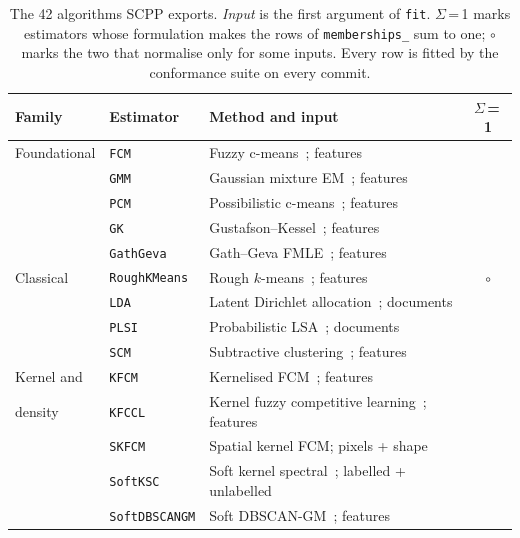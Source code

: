 \documentclass[twoside,11pt]{article}
\newcommand{\cmark}{\textcolor{green!70!black}{\ding{51}}}
\newcommand{\xmark}{\textcolor{red!75!black}{\ding{55}}}
\newcommand{\pmark}{\textcolor{orange!80!black}{$\circ$}}
\begin{document}
\begin{table}[ht]
\centering
\caption{The 42 algorithms SCPP exports. \emph{Input} is the first argument
of \texttt{fit}. $\Sigma$\,=\,1 marks estimators whose formulation makes the
rows of \texttt{memberships\_} sum to one; \pmark{} marks the two that
normalise only for some inputs. Every row is fitted by the conformance suite
on every commit.}
\small
\setlength{\tabcolsep}{4pt}
\renewcommand{\arraystretch}{1.1}
\label{tab:scpp_algorithm_families}

\begin{tabular}{p{2.6cm} p{3.4cm} p{4.4cm} c}
\toprule
\textbf{Family} & \textbf{Estimator} & \textbf{Method and input} & $\Sigma$\,=\,1 \\
\midrule

\rowcolor{gray!10}
Foundational & \texttt{FCM} & Fuzzy c-means~\cite{bezdek1981pattern}; features & \cmark \\
\rowcolor{gray!10}
& \texttt{GMM} & Gaussian mixture EM~\cite{dempster1977maximum}; features & \cmark \\
\rowcolor{gray!10}
& \texttt{PCM} & Possibilistic c-means~\cite{krishnapuram1993possibilistic}; features & \xmark \\
\rowcolor{gray!10}
& \texttt{GK} & Gustafson--Kessel~\cite{gustafson1979fuzzy}; features & \cmark \\
\rowcolor{gray!10}
& \texttt{GathGeva} & Gath--Geva FMLE~\cite{gath1989fuzzy}; features & \cmark \\

Classical
& \texttt{RoughKMeans} & Rough $k$-means~\cite{lingras2004interval}; features & \pmark \\
& \texttt{LDA} & Latent Dirichlet allocation~\cite{blei2003latent}; documents & \cmark \\
& \texttt{PLSI} & Probabilistic LSA~\cite{hofmann1999plsa}; documents & \cmark \\
& \texttt{SCM} & Subtractive clustering~\cite{chiu1994fuzzy}; features & \cmark \\

\rowcolor{gray!10}
Kernel and
& \texttt{KFCM} & Kernelised FCM~\cite{zhang2004novel}; features & \cmark \\
\rowcolor{gray!10}
density
& \texttt{KFCCL} & Kernel fuzzy competitive learning~\cite{mizutani2005kernel}; features & \cmark \\
\rowcolor{gray!10}
& \texttt{SKFCM} & Spatial kernel FCM; pixels + shape & \cmark \\
\rowcolor{gray!10}
& \texttt{SoftKSC} & Soft kernel spectral~\cite{langone2013soft}; labelled + unlabelled & \cmark \\
\rowcolor{gray!10}
& \texttt{SoftDBSCANGM} & Soft DBSCAN-GM~\cite{smiti2016fuzzy}; features & \cmark \\


\end{tabular}
\end{table}
\end{document}
